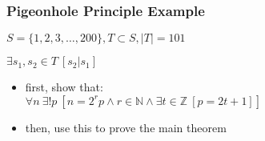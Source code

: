 \documentclass[dvipsnames]{beamer}
\begin{document}
\begin{frame}
  \frametitle{Pigeonhole Principle Example}

  \begin{theorem}
    $S = \{1,2,3,\dots,200\}, T \subset S, |T| = 101$

    $\exists s_1,s_2 \in T~[s_2 | s_1]$
  \end{theorem}

  \pause
  \begin{itemize}
    \item first, show that:\\
      $\forall n~\exists ! p~
        [n = 2^r p \wedge r \in \mathbb{N}
          \wedge \exists t \in \mathbb Z~[p = 2t + 1]]$\\

    \item then, use this to prove the main theorem
  \end{itemize}
\end{frame}
\end{document}
